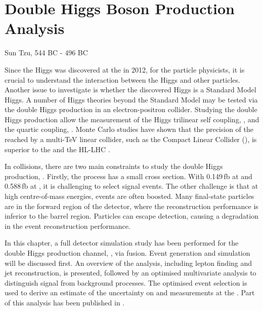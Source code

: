 \chapter{Double Higgs Boson Production Analysis}
\label{chap:DoubleHiggs}

%
{Sun Tzu, 544 BC - 496 BC}%


Since the Higgs was discovered at the \LHC in 2012\cite{Aad:2012tfa,Chatrchyan:2012ufa}, for the particle physicists, it is crucial to understand the interaction between the Higgs and other particles. Another issue to investigate is whether the discovered Higgs is a Standard Model Higgs. A number of Higgs theories beyond the Standard Model may be tested via the double Higgs production in an electron-positron collider. Studying the double Higgs production allow the measurement of the Higgs trilinear self coupling, \gHHH, and the quartic coupling, \gWWHH. Monte Carlo studies have shown that the precision of the \gHHH reached by a multi-TeV linear collider, such as the Compact Linear Collider (\CLIC), is superior to the \LHC and the HL-LHC  \cite{Contino:2013gna}.


In \ee collisions, there are two main constraints to study the double Higgs production,  \eeToHH. Firstly, the process has a small cross section. With 0.149\,fb at  and 0.588\,fb at , it is challenging to select signal events. The other challenge is that at high centre-of-mass energies, events are often boosted.  Many final-state particles are in the forward region of the detector, where the reconstruction performance is inferior to the barrel region.  Particles can escape detection, causing a degradation in the event reconstruction performance.


In this chapter, a full \CLICILD detector simulation study has been performed for the double Higgs production channel, \eeToHH, via \WW fusion. Event generation and simulation will be discussed first. An overview of the analysis, including lepton finding and jet reconstruction, is presented, followed by an optimised multivariate analysis to distinguish signal from background processes. The optimised event selection is used to derive an estimate of the uncertainty on  \gHHH and \gWWHH measurements at the \CLIC. Part  of this analysis has been published in \cite{Abramowicz:2016zbo}.

